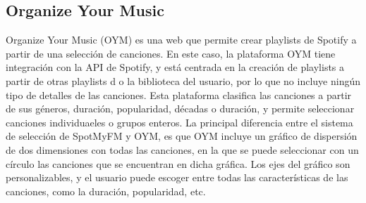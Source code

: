 \subsection{Organize Your Music}
Organize Your Music \cite{OrganizeYourPlaylist} (OYM) es una web que permite crear playlists de Spotify a partir de una selección de canciones. En este caso, la plataforma OYM tiene integración con la API de Spotify, y está centrada en la creación de playlists a partir de otras playlists d o la biblioteca del usuario, por lo que no incluye ningún tipo de detalles de las canciones. 
Esta plataforma clasifica las canciones a partir de sus géneros, duración, popularidad, décadas o duración, y permite seleccionar canciones individuaeles o grupos enteros. 
La principal diferencia entre el sistema de selección de SpotMyFM y OYM, es que OYM incluye un gráfico de dispersión de dos dimensiones con todas las canciones, en la que se puede seleccionar con un círculo las canciones que se encuentran en dicha gráfica. Los ejes del gráfico son personalizables, y el usuario puede escoger entre todas las características de las canciones, como la duración, popularidad, etc. 